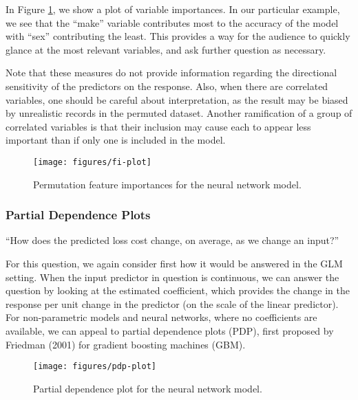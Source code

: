 \documentclass[preprint, 3p, twocolumn, letterpaper, 10pt]{elsarticle} %
\begin{document}
In Figure \ref{fig:fi}, we show a plot of variable importances. In our
particular example, we see that the ``make'' variable contributes most to the
accuracy of the model with ``sex'' contributing the least. This provides a way
for the audience to quickly glance at the most relevant variables, and ask
further question as necessary.

Note that these measures do not provide information regarding the directional
sensitivity of the predictors on the response. Also, when there are correlated
variables, one should be careful about interpretation, as the result may be
biased by unrealistic records in the permuted dataset. Another ramification
of a group of correlated variables is that their inclusion may cause each to
appear less important than if only one is included in the model.

\begin{figure}

{\centering \texttt{[image: figures/fi-plot]} 

}

\caption{Permutation feature importances for the neural network model.}\label{fig:fi}
\end{figure}

\hypertarget{partial-dependence-plots}{%
\subsubsection{Partial Dependence Plots}\label{partial-dependence-plots}}

``How does the predicted loss cost change, on average, as we change an input?''

For this question, we again consider first how it would be answered in the GLM
setting. When the input predictor in question is continuous, we can answer the
question by looking at the estimated coefficient, which provides the change in
the response per unit change in the predictor (on the scale of the linear
predictor). For non-parametric models and neural networks, where no coefficients
are available, we can appeal to partial dependence plots (PDP), first proposed
by Friedman (2001) for gradient boosting machines (GBM).

\begin{figure*}[h]

{\centering \texttt{[image: figures/pdp-plot]} 

}

\caption{Partial dependence plot for the neural network model.}\label{fig:pdp}
\end{figure*}
\end{document}
